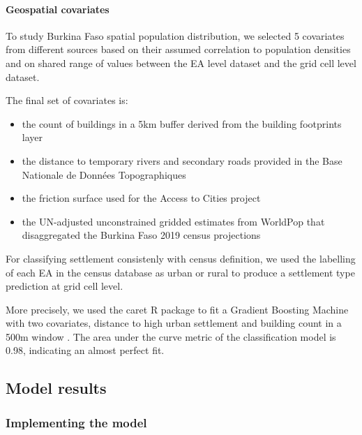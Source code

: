 \documentclass[]{book}
\let\oldparagraph\paragraph
\renewcommand{\paragraph}[1]{\oldparagraph{#1}\mbox{}}
\begin{document}
\paragraph{Geospatial covariates}\label{geospatial-covariates-1}

To study Burkina Faso spatial population distribution, we selected 5
covariates from different sources based on their assumed correlation to
population densities and on shared range of values between the EA level
dataset and the grid cell level dataset.

The final set of covariates is:

\begin{itemize}
\item
  the count of buildings in a 5km buffer derived from the building
  footprints layer \citep{ecopia.ai2019}
\item
  the distance to temporary rivers and secondary roads provided in the
  Base Nationale de Données Topographiques
  \citep{institutgeographiqueduburkinafaso2015}
\item
  the friction surface used for the Access to Cities project
  \citep{weiss2018}
\item
  the UN-adjusted unconstrained gridded estimates from WorldPop that
  disaggregated the Burkina Faso 2019 census projections
  \citep{worldpop2018global}
\end{itemize}

For classifying settlement consistenly with census definition, we used
the labelling of each EA in the census database as urban or rural to
produce a settlement type prediction at grid cell level.

More precisely, we used the caret R package \citep{kuhn2020} to fit a
Gradient Boosting Machine with two covariates, distance to high urban
settlement \citep{institutgeographiqueduburkinafaso2015} and building
count in a 500m window \citep{ecopia.ai2019}. The area under the curve
metric of the classification model is 0.98, indicating an almost perfect
fit.

\subsection{Model results}\label{model-results}

\subsubsection{Implementing the model}\label{implementing-the-model}
\end{document}
